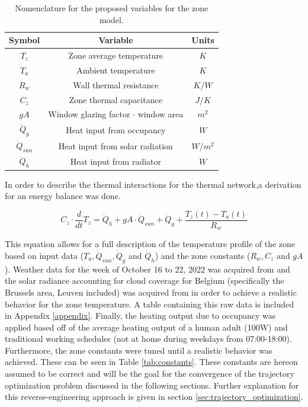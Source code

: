 \begin{table}[H]
\centering
\begin{tabular}{c|c|c}
Symbol & Variable & Units \\
\hline
\hline
$T_z$ & Zone average temperature & $K$\\
$T_a$ & Ambient temperature & $K$\\
$R_w$ & Wall thermal resistance & $K/W$\\
$C_z$ & Zone thermal capacitance & $J/K$\\
$gA$ & Window glazing factor $\cdot$ window area & $m^2$\\
$\dot{Q}_g$ & Heat input from occupancy & $W$\\
$\dot{Q}_{sun}$ & Heat input from solar radiation & $W/m^2$\\
$\dot{Q}_h$ & Heat input from radiator & $W$
\end{tabular}
\caption{Nomenclature for the proposed variables for the zone model.}
\label{tab:nomenclature_model}
\end{table}

In order to describe the thermal interactions for the thermal network,a derivation for an energy balance was done.

\begin{equation}
C_z \cdot \frac{d}{dt} T_z = \dot{Q}_h + gA \cdot \dot{Q}_{sun} + \dot{Q}_g + \frac{T_z(t)-T_a(t)}{R_w}
\label{eq:energy_balance}
\end{equation}

This equation allows for a full description of the temperature profile of the zone based on input data ($T_a, \dot{Q}_{sun}, \dot{Q}_g$ and $\dot{Q}_h$) and the zone constants ($R_w, C_z$ and $gA$). Weather data for the week of October 16 to 22, 2022 was acquired from \cite{nooa_2022} and the solar radiance accounting for cloud coverage for Belgium (specifically the Brussels area, Leuven included) was acquired from \cite{kunstmann} in order to achieve a realistic behavior for the zone temperature. A table containing this raw data is included in Appendix \ref{appendix}. Finally, the heating output due to occupancy was applied based off of the average heating output of a human adult (100W) and traditional working schedules (not at home during weekdays from 07:00-18:00). \\

Furthermore, the zone constants were tuned until a realistic behavior was achieved. These can be seen in Table \ref{tab:constants}. These constants are hereon assumed to be correct and will be the goal for the convergence of the trajectory optimization problem discussed in the following sections. Further explanation for this reverse-engineering approach is given in section \ref{sec:trajectory_optimization}.

